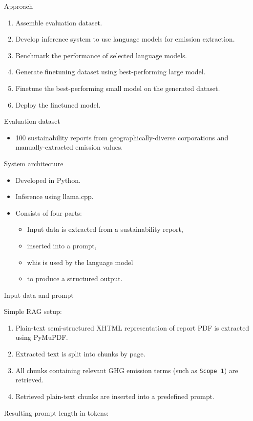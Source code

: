 \documentclass{beamer}
\begin{document}
\begin{frame}{Approach}
	\begin{enumerate}
\item Assemble evaluation dataset.
\item Develop inference system to use language models for emission extraction.
\item Benchmark the performance of selected language models.
\item Generate finetuning dataset using best-performing large model.
\item Finetune the best-performing small model on the generated dataset.
\item Deploy the finetuned model.
	\end{enumerate}
\end{frame}

\begin{frame}{Evaluation dataset}
\begin{itemize}
\item 100 sustainability reports from geographically-diverse corporations and manually-extracted emission values.
\end{itemize}
\end{frame}

\begin{frame}{System architecture}
\begin{itemize}
\item Developed in Python.
\item Inference using llama.cpp.
\item Consists of four parts:
\begin{itemize}
\item \alert{Input data} is extracted from a sustainability report,
\item inserted into a \alert{prompt},
\item whis is used by the \alert{language model}
\item to produce a \alert{structured output}.
\end{itemize}
\end{itemize}
\end{frame}

\begin{frame}{Input data and prompt}

Simple RAG setup:

\begin{enumerate}
\item Plain-text semi-structured XHTML representation of report PDF is extracted using PyMuPDF.
\item Extracted text is split into chunks by page.
\item All chunks containing relevant GHG emission terms (such as \texttt{Scope 1}) are retrieved.
\item Retrieved plain-text chunks are inserted into a predefined prompt.
\end{enumerate}
Resulting prompt length in tokens:
\begin{table}[h]
	
\end{table}
\end{frame}
\end{document}
